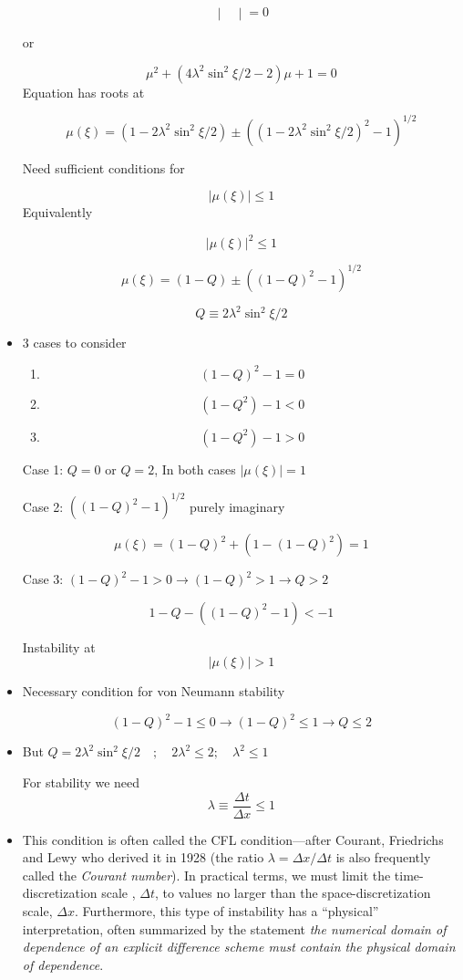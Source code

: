 \begin{itemize}
\[\begin{vmatrix}
    \end{vmatrix} = 0
    \]

    or

    \[ \mu^2 + (4 \lambda^2 \sin^2\xi/2 -2 ) \mu + 1 = 0\]
    Equation has roots at

    \[ \mu ( \xi) = (1-2\lambda^2 \sin^2 \xi/2 ) \pm ((1-2\lambda^2 \sin^2 \xi/2)^2 -1)^{1/2}\]

    Need sufficient conditions for

    \[ |\mu(\xi)| \le 1\]
    Equivalently

    \[ |\mu(\xi)|^2 \le 1\]

    \[ \mu(\xi) = (1-Q) \pm ((1-Q)^2-1)^{1/2} \]

    \[ Q\equiv 2 \lambda^2 \sin^2 \xi/2\]

    \item 3 cases to consider

    \begin{enumerate}
        \item \[(1-Q)^2-1 = 0\]

        \item \[(1-Q^2)-1 < 0\]

        \item \[ (1-Q^2)-1 > 0\]
    \end{enumerate}

    Case 1: $Q=0$ or $Q=2$, In both cases $|\mu(\xi)|=1$

    Case 2: $((1-Q)^2-1)^{1/2}$ purely imaginary

    \[ \mu(\xi) = (1-Q)^2 + (1-(1-Q)^2) = 1\]

    Case 3: $(1-Q)^2 -1 > 0 \rightarrow (1-Q)^2 > 1 \rightarrow Q>2$

    \[ 1-Q - ((1-Q)^2-1) < -1\]

    Instability at
    \[ |\mu(\xi)| > 1\] 

    \item Necessary condition for von Neumann stability

    \[ (1-Q)^2 -1 \le 0 \rightarrow (1-Q)^2 \le 1 \rightarrow Q \le 2\]

    \item But $Q=2\lambda^2 \sin^2 \xi/2 \quad ; \quad 2 \lambda^2 \le 2 ; \quad \lambda^2 \le 1$

    For stability we need
    \[ \lambda \equiv \frac{\Delta t}{\Delta x} \le 1\]

    \item This condition is often called the CFL condition—after Courant, Friedrichs and Lewy who derived it in 1928 (the ratio $\lambda = \Delta x/ \Delta t$ is also frequently called the \textit{Courant number}). In practical terms, we must limit the time-discretization scale , $\Delta t$, to values no larger than the space-discretization scale, $\Delta x$. Furthermore, this type of instability has a “physical” interpretation, often summarized by the statement \textit{the numerical domain of dependence of an explicit difference scheme must contain the physical domain of dependence}.


\end{itemize}
